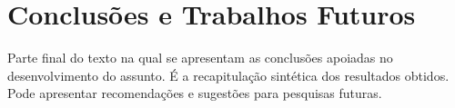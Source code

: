 \chapter{Conclusões e Trabalhos Futuros}
\label{chap:conclusoes-e-trabalhos-futuros}

Parte final do texto na qual se apresentam as conclusões apoiadas no desenvolvimento do assunto. É a recapitulação sintética dos resultados obtidos. Pode apresentar recomendações e sugestões para pesquisas futuras.











